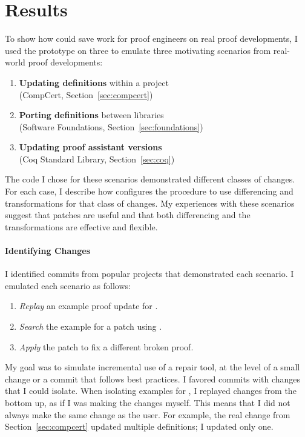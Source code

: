 \section{Results}
\label{sec:pumpkin-results}



To show how \sysname could save work for proof engineers on real proof developments, I used the \sysname prototype on three  to emulate three motivating scenarios from real-world proof developments:

\begin{enumerate}
\item \textbf{Updating definitions} within a project \\
(CompCert, Section~\ref{sec:compcert})
\item \textbf{Porting definitions} between libraries \\
(Software Foundations, Section~\ref{sec:foundations})
\item \textbf{Updating proof assistant versions} \\
(Coq Standard Library, Section~\ref{sec:coq})
\end{enumerate}
The code I chose for these scenarios demonstrated different classes of changes.
For each case, I describe how \sysname configures the procedure to use differencing and transformations for that class of changes.
My experiences with these scenarios suggest that patches are useful and that both differencing and the transformations 
are effective and flexible.

\paragraph{Identifying Changes} I identified commits from popular projects that
demonstrated each scenario.
I emulated each scenario as follows:

\begin{enumerate}
\item \textit{Replay} an example proof update for \sysname.
\item \textit{Search} the example for a patch using \sysname.
\item \textit{Apply} the patch to fix a different broken proof.
\end{enumerate}
My goal was to simulate incremental use of a repair tool,
at the level of a small change or a commit that follows best practices.
I favored commits with changes that I could isolate.
When isolating examples for \sysname, I replayed changes from the bottom up,
as if I was making the changes myself.
This means that I did not always make the same change as the user. For example,
the real change from Section~\ref{sec:compcert} updated multiple definitions;
I updated only one.

